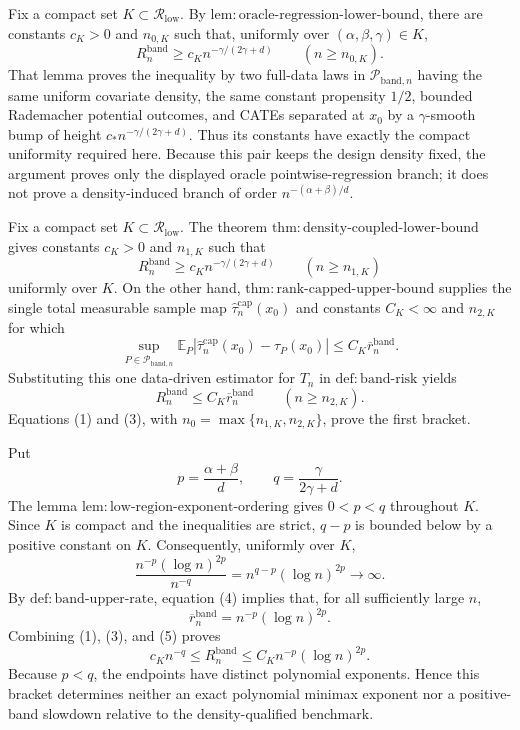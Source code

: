 Fix a compact set \(K\subset\mathcal R_{\mathrm{low}}\).  By
\(\mathrm{lem:oracle\mbox{-}regression\mbox{-}lower\mbox{-}bound}\), there
are constants \(c_K>0\) and \(n_{0,K}\) such that, uniformly over
\((\alpha,\beta,\gamma)\in K\),
\[
R_n^{\mathrm{band}}\geq c_K n^{-\gamma/(2\gamma+d)}
\qquad(n\geq n_{0,K}).
\]
That lemma proves the inequality by two full-data laws in
\(\mathcal P_{\mathrm{band},n}\) having the same uniform covariate density,
the same constant propensity \(1/2\), bounded Rademacher potential outcomes,
and CATEs separated at \(x_0\) by a \(\gamma\)-smooth bump of height
\(c_*n^{-\gamma/(2\gamma+d)}\).  Thus its constants have exactly the compact
uniformity required here.  Because this pair keeps the design density fixed,
the argument proves only the displayed oracle pointwise-regression branch; it
does not prove a density-induced branch of order
\(n^{-(\alpha+\beta)/d}\).

Fix a compact set \(K\subset\mathcal R_{\mathrm{low}}\).  The theorem
\(\mathrm{thm:density\mbox{-}coupled\mbox{-}lower\mbox{-}bound}\) gives
constants \(c_K>0\) and \(n_{1,K}\) such that
\[
R_n^{\mathrm{band}}\geq c_K n^{-\gamma/(2\gamma+d)}
\qquad(n\geq n_{1,K})
\tag{1}
\]
uniformly over \(K\).  On the other hand,
\(\mathrm{thm:rank\mbox{-}capped\mbox{-}upper\mbox{-}bound}\) supplies the
single total measurable sample map
\(\widehat\tau_n^{\mathrm{cap}}(x_0)\) and constants \(C_K<\infty\) and
\(n_{2,K}\) for which
\[
\sup_{P\in\mathcal P_{\mathrm{band},n}}
\mathbb E_P\left|
\widehat\tau_n^{\mathrm{cap}}(x_0)-\tau_P(x_0)
\right|
\leq C_K\overline r_n^{\mathrm{band}}.
\tag{2}
\]
Substituting this one data-driven estimator for \(T_n\) in
\(\mathrm{def:band\mbox{-}risk}\) yields
\[
R_n^{\mathrm{band}}\leq C_K\overline r_n^{\mathrm{band}}
\qquad(n\geq n_{2,K}).
\tag{3}
\]
Equations (1) and (3), with
\(n_0=\max\{n_{1,K},n_{2,K}\}\), prove the first bracket.

Put
\[
p=\frac{\alpha+\beta}{d},
\qquad
q=\frac{\gamma}{2\gamma+d}.
\]
The lemma
\(\mathrm{lem:low\mbox{-}region\mbox{-}exponent\mbox{-}ordering}\) gives
\(0<p<q\) throughout \(K\).  Since \(K\) is compact and the inequalities
are strict, \(q-p\) is bounded below by a positive constant on \(K\).
Consequently, uniformly over \(K\),
\[
\frac{n^{-p}(\log n)^{2p}}{n^{-q}}
=n^{q-p}(\log n)^{2p}\longrightarrow\infty.
\tag{4}
\]
By \(\mathrm{def:band\mbox{-}upper\mbox{-}rate}\), equation (4) implies
that, for all sufficiently large \(n\),
\[
\overline r_n^{\mathrm{band}}
=n^{-p}(\log n)^{2p}.
\tag{5}
\]
Combining (1), (3), and (5) proves
\[
c_Kn^{-q}\leq R_n^{\mathrm{band}}
\leq C_Kn^{-p}(\log n)^{2p}.
\]
Because \(p<q\), the endpoints have distinct polynomial exponents.  Hence
this bracket determines neither an exact polynomial minimax exponent nor a
positive-band slowdown relative to the density-qualified benchmark.

